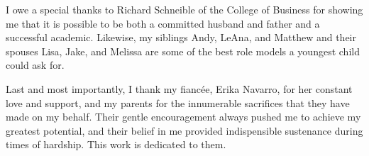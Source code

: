 I owe a special thanks to Richard Schneible of the College of Business for showing me that it is possible to be both a committed husband and father and a successful academic.
Likewise, my siblings Andy, LeAna, and Matthew and their spouses Lisa, Jake, and Melissa are some of the best role models a youngest child could ask for.

Last and most importantly, I thank my fianc\'ee, Erika Navarro, for her constant love and support, and my parents for the innumerable sacrifices that they have made on my behalf.
Their gentle encouragement always pushed me to achieve my greatest potential, and their belief in me provided indispensible sustenance during times of hardship. 
This work is dedicated to them.

